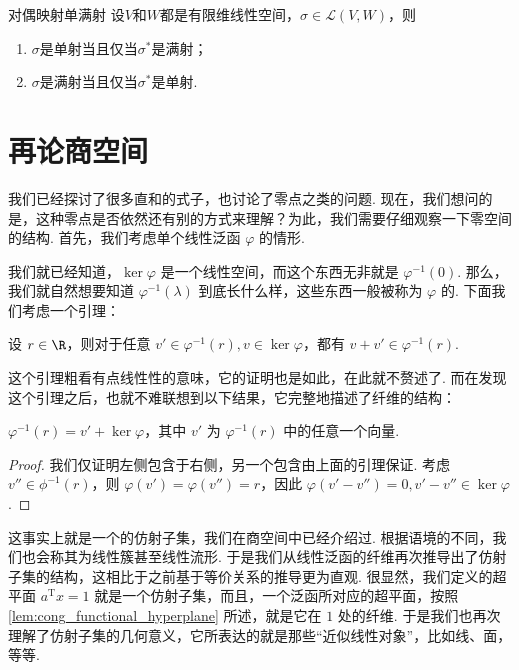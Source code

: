 \begin{corollary}{}{对偶映射单满射}
    设$V$和$W$都是有限维线性空间，$\sigma\in\mathcal{L}(V,W)$，则
    \begin{enumerate}
        \item $\sigma$是单射当且仅当$\sigma^*$是满射；

        \item $\sigma$是满射当且仅当$\sigma^*$是单射.
    \end{enumerate}
\end{corollary}

\section{再论商空间}

我们已经探讨了很多直和的式子，也讨论了零点之类的问题. 现在，我们想问的是，这种零点是否依然还有别的方式来理解？为此，我们需要仔细观察一下零空间的结构. 首先，我们考虑单个线性泛函 $\varphi$ 的情形.

我们就已经知道，$\ker \varphi$ 是一个线性空间，而这个东西无非就是 $\varphi^{-1} (0)$. 那么，我们就自然想要知道 $\varphi^{-1} (\lambda)$ 到底长什么样，这些东西一般被称为 $\varphi$ 的. 下面我们考虑一个引理：

\begin{lemma}{}{}
    设 $r \in \R$，则对于任意 $v' \in \varphi^{-1}(r), v \in \ker \varphi$，都有 $v + v' \in \varphi^{-1} (r)$.
\end{lemma}

这个引理粗看有点线性性的意味，它的证明也是如此，在此就不赘述了. 而在发现这个引理之后，也就不难联想到以下结果，它完整地描述了纤维的结构：

\begin{theorem}{}{}
    $\varphi^{-1} (r) = v' + \ker \varphi$，其中 $v'$ 为 $\varphi^{-1} (r)$ 中的任意一个向量.
\end{theorem}

\begin{proof}
    我们仅证明左侧包含于右侧，另一个包含由上面的引理保证. 考虑 $v'' \in \phi^{-1} (r)$，则 $\varphi (v') = \varphi (v'') = r$，因此 $\varphi(v' - v'') = 0, v' - v'' \in \ker \varphi$.
\end{proof}

这事实上就是一个的仿射子集，我们在商空间中已经介绍过. 根据语境的不同，我们也会称其为线性簇甚至线性流形. 于是我们从线性泛函的纤维再次推导出了仿射子集的结构，这相比于之前基于等价关系的推导更为直观. 很显然，我们定义的超平面 $a^\mathrm{T}x = 1$ 就是一个仿射子集，而且，一个泛函所对应的超平面，按照\autoref{lem:cong_functional_hyperplane} 所述，就是它在 $1$ 处的纤维. 于是我们也再次理解了仿射子集的几何意义，它所表达的就是那些``近似线性对象''，比如线、面，等等.

